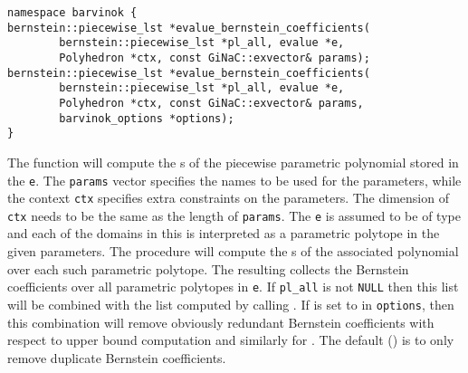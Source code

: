 \begin{verbatim}
namespace barvinok {
bernstein::piecewise_lst *evalue_bernstein_coefficients(
	    bernstein::piecewise_lst *pl_all, evalue *e, 
	    Polyhedron *ctx, const GiNaC::exvector& params);
bernstein::piecewise_lst *evalue_bernstein_coefficients(
	    bernstein::piecewise_lst *pl_all, evalue *e, 
	    Polyhedron *ctx, const GiNaC::exvector& params,
	    barvinok_options *options);
}
\end{verbatim}
The  function will compute the
s of the piecewise parametric polynomial stored in the
 \verb+e+.
The \verb+params+ vector specifies the names to be used for the parameters,
while the context  \verb+ctx+ specifies extra constraints
on the parameters.
The dimension of \verb+ctx+ needs to be the same as the length of \verb+params+.
The  \verb+e+ is assumed to be of type 
and each of the domains in this  is interpreted
as a parametric polytope in the given parameters. The procedure
will compute the s of the associated polynomial
over each such parametric polytope.
The resulting  collects the 
Bernstein coefficients over all parametric polytopes in \verb+e+.
If \verb+pl_all+ is not \verb+NULL+ then this list will be combined
with the list computed by calling .
If  is set to 
in \verb+options+, then this combination will remove obviously
redundant Bernstein coefficients with respect to upper bound computation
and similarly for .
The default () is to only remove duplicate
Bernstein coefficients.
